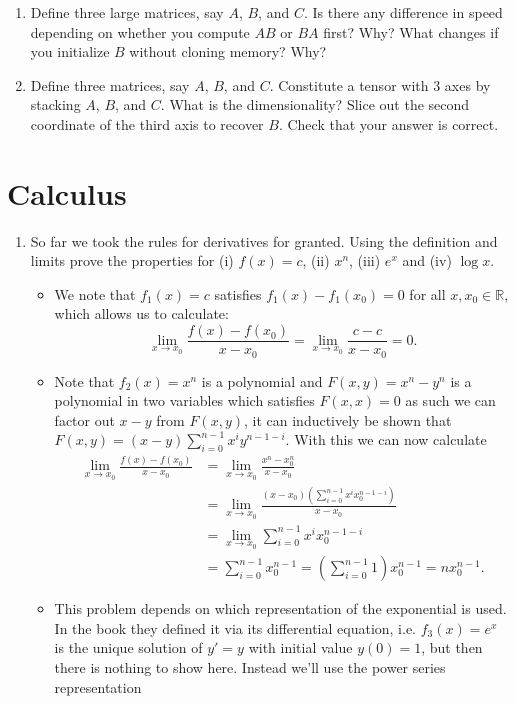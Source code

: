 \documentclass{article}
\begin{document}
\begin{enumerate}
    \item Define three large matrices, say $A$, $B$, and $C$. Is there any difference in speed depending on whether you compute $AB$ or $BA$ first? Why? What changes if you initialize $B$ without cloning memory? Why?

    \item Define three matrices, say $A$, $B$, and $C$. Constitute a tensor with $3$ axes by stacking $A$, $B$, and $C$. What is the dimensionality? Slice out the second coordinate of the third axis to recover $B$. Check that your answer is correct.
\end{enumerate}


\section{Calculus}
\begin{enumerate} 
\item So far we took the rules for derivatives for granted. Using the definition and limits prove the properties for (i) $f(x) = c$, (ii) $x^n$, (iii) $e^x$ and (iv) $\log x$.
	\begin{itemize}
	\item We note that $f_1(x) = c$ satisfies $f_1(x) - f_1(x_0) = 0$ for all $x, x_0 \in \mathbb{R}$, which allows us to calculate:
	$$
	\lim_{x \rightarrow x_0} \frac{f(x) - f(x_0)}{x - x_0} = \lim_{x \rightarrow x_0} \frac{c - c}{x - x_0} = 0.
	$$
	\item Note that $f_2(x) = x^n$ is a polynomial and $F(x, y) = x^n - y^n$ is a polynomial in two variables which satisfies $F(x, x) = 0$ as such we can factor out $x - y$ from $F(x, y)$, it can inductively be shown that $F(x, y) = (x - y) \sum_{i = 0}^{n - 1} x^i y^{n - 1 - i}$. With this we can now calculate
	\begin{align*}
	\lim_{x \rightarrow x_0} \frac{f(x) - f(x_0)}{x - x_0} &= \lim_{x \rightarrow x_0} \frac{x^n - x_0^n}{x - x_0} \\
	&= \lim_{x \rightarrow x_0} \frac{(x - x_0)\left(\sum_{i = 0}^{n - 1} x^i x_0^{n - 1 - i}\right)}{x - x_0} \\
	&= \lim_{x \rightarrow x_0} \sum_{i = 0}^{n - 1} x^i x_0^{n - 1 - i} \\
	&= \sum_{i = 0}^{n - 1} x_0^{n - 1} = \left(\sum_{i = 0}^{n - 1} 1\right) x_0^{n - 1} = n x_0^{n - 1}.
	\end{align*}
	\item This problem depends on which representation of the exponential is used. In the book they defined it via its differential equation, i.e. $f_3(x) = e^x$ is the unique solution of $y' = y$ with initial value $y(0) = 1$, but then there is nothing to show here. Instead we'll use the power series representation

\end{itemize}
\end{enumerate}
\end{document}
